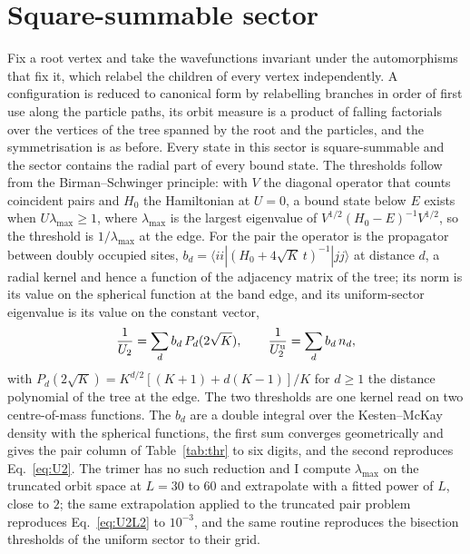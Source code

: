 \documentclass[aps,pre,twocolumn,superscriptaddress,floatfix]{revtex4-2}
\newcommand{\Up}{U_{2}}
\begin{document}
\section{Square-summable sector}
\label{sec:l2}
Fix a root vertex and take the
wavefunctions invariant under the automorphisms that fix it, which relabel
the children of every vertex independently. A configuration is reduced to
canonical form by relabelling branches in order of first use along the
particle paths, its orbit measure is a product of falling factorials over
the vertices of the tree spanned by the root and the particles, and the
symmetrisation is as before. Every state in this sector is square-summable
and the sector contains the radial part of every bound state. The
thresholds follow from the Birman--Schwinger principle: with $V$ the
diagonal operator that counts coincident pairs and $H_{0}$ the Hamiltonian
at $U=0$, a bound state below $E$ exists when $U\lambda_{\max}\ge1$, where
$\lambda_{\max}$ is the largest eigenvalue of
$V^{1/2}(H_{0}-E)^{-1}V^{1/2}$, so the threshold is $1/\lambda_{\max}$ at
the edge. For the pair the operator is the propagator between doubly
occupied sites, $b_{d}=\langle ii|(H_{0}+4\sqrt{K}\,t)^{-1}|jj\rangle$ at
distance $d$, a radial kernel and hence a function of the adjacency matrix
of the tree; its norm is its value on the spherical function at the band
edge, and its uniform-sector eigenvalue is its value on the constant
vector,
\begin{equation}
  \frac{1}{\Up}=\sum_{d}b_{d}\,P_{d}(2\sqrt{K}),\qquad
  \frac{1}{\Up^{\rm u}}=\sum_{d}b_{d}\,n_{d},
  \label{eq:U2L2}
\end{equation}
with $P_{d}(2\sqrt{K})=K^{d/2}[(K+1)+d(K-1)]/K$ for $d\ge1$ the distance
polynomial of the tree at the edge. The two thresholds are one kernel read
on two centre-of-mass functions. The $b_{d}$ are a double integral over
the Kesten--McKay density with the spherical functions, the first sum
converges geometrically and gives the pair column of Table~\ref{tab:thr} to
six digits, and the second reproduces Eq.~\eqref{eq:U2}. The trimer has no
such reduction and I compute $\lambda_{\max}$ on the truncated orbit space
at $L=30$ to $60$ and extrapolate with a fitted power of $L$, close to
$2$; the same extrapolation applied to the truncated pair problem
reproduces Eq.~\eqref{eq:U2L2} to $10^{-3}$, and the same routine
reproduces the bisection thresholds of the uniform sector to their grid.
\end{document}
